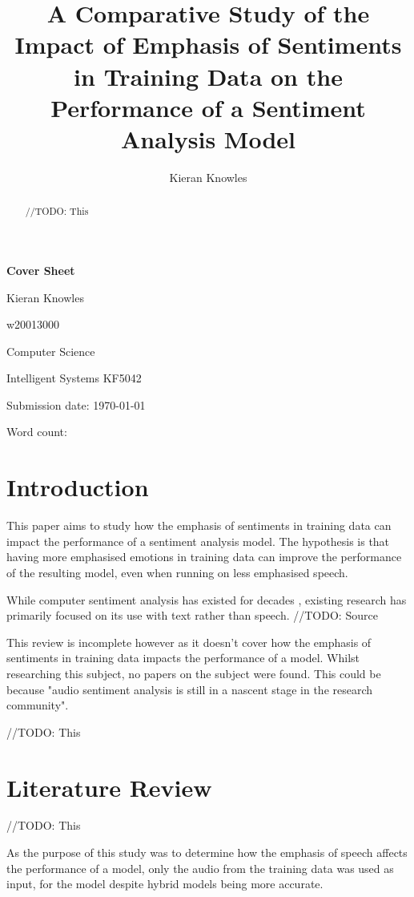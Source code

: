 \documentclass[journal]{IEEEtran}
\newcommand\wordcount{
    
}
\begin{document}
{\Large \textbf{Cover Sheet}}

Kieran Knowles

w20013000

Computer Science

Intelligent Systems KF5042

Submission date: \today

Word count: \wordcount

\title{A Comparative Study of the Impact of Emphasis of Sentiments in Training Data on the Performance of a Sentiment Analysis Model}
\author{Kieran Knowles}
\maketitle


\begin{abstract}
    //TODO: This

\end{abstract}

\section{Introduction}
This paper aims to study how the emphasis of sentiments in training data can impact the performance of a sentiment analysis
model. The hypothesis is that having more emphasised emotions in training data can improve the performance of the resulting
model, even when running on less emphasised speech.

While computer sentiment analysis has existed for decades \cite{stone_computer_1963}, existing research has primarily focused on
its use with text rather than speech. //TODO: Source

This review is incomplete however as it doesn't cover how the emphasis of sentiments in training data impacts the performance of a model.
Whilst researching this subject, no papers on the subject were found.
This could be because "audio sentiment analysis is still in a nascent stage
in the research community". \cite{maghilnan_sentiment_2017}

//TODO: This

\section{Literature Review}

//TODO: This

As the purpose of this study was to determine how the emphasis of speech affects
the performance of a model, only the audio from the training data was used as input,
for the model despite hybrid models being more accurate. \cite{bhaskar_hybrid_2015}
\end{document}

